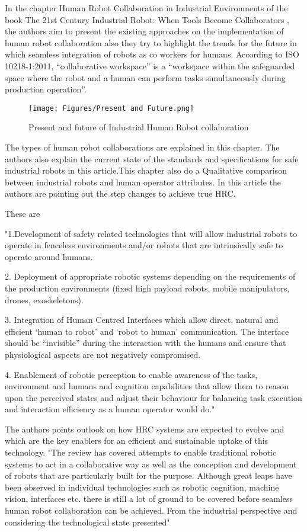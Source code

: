 {In the chapter Human Robot Collaboration in Industrial Environments of the book The 21st Century Industrial Robot: When Tools Become Collaborators , the authors aim to present the existing approaches on the implementation of  human robot collaboration also they try to highlight the trends for the future in which seamless integration of robots as co workers for humans.
According to ISO 10218-1:2011, “collaborative workspace” is a “workspace within the safeguarded space where the robot and a human can perform tasks simultaneously during production operation”.
 \begin{figure}[H]
     \centering
     \texttt{[image: Figures/Present and Future.png]}
     \caption{Present and future of Industrial Human Robot collaboration\cite{author3}}
     \label{fig:2}
 \end{figure}
The types of human robot collaborations are explained in this chapter.
The authors also explain the current state of the standards and specifications for safe industrial robots in this article.This chapter also do a Qualitative comparison between industrial robots and human operator attributes. In this article the authors are pointing out the step changes to achieve true HRC.

These are

"1.Development of safety related technologies that will allow industrial robots to operate in fenceless environments and/or robots that are intrinsically safe to operate around humans.

2. Deployment of appropriate robotic systems depending on the requirements of the production environments (fixed high payload robots, mobile manipulators, drones, exoskeletons). 

3. Integration of Human Centred Interfaces which allow direct, natural and efficient ‘human to robot’ and ‘robot to human’ communication. The interface should be “invisible” during the interaction with the humans and ensure that physiological aspects are not negatively compromised.

4. Enablement of robotic perception to enable awareness of the tasks, environment and humans and cognition capabilities that allow them to reason upon the perceived states and adjust their behaviour for balancing task execution and interaction efficiency as a human operator would do."\cite{author3}
 
The authors points outlook on how HRC systems are expected to evolve and which are the key enablers for an efficient and sustainable uptake of this technology.
"The review has covered attempts to enable traditional robotic systems to act in a collaborative way as well as the conception and development of robots that are particularly built for the purpose. Although great leaps have been observed in individual technologies such as robotic cognition, machine vision, interfaces etc. there is still a lot of ground to be covered before seamless human robot collaboration can be achieved. From the industrial perspective and considering the technological state presented"\cite{author3}

}
